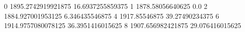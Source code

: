 0 1895.2742919921875 16.6937255859375
1 1878.58056640625 0.0
2 1884.927001953125 6.346435546875
4 1917.85546875 39.27490234375
6 1914.9757080078125 36.3951416015625
8 1907.656982421875 29.076416015625
